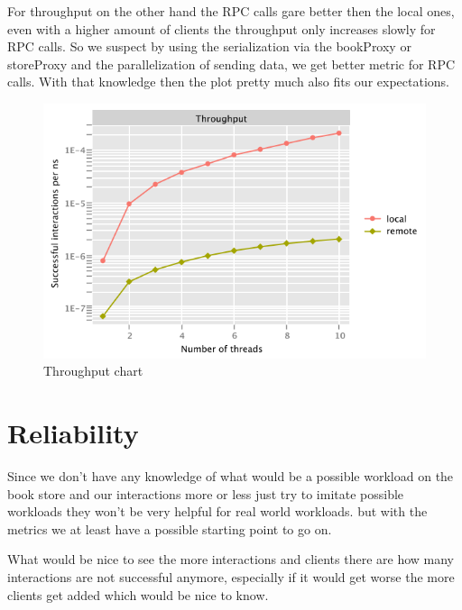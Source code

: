 \documentclass[12pt,a4paper]{article}
\begin{document}
For throughput on the other hand the RPC calls gare better then the local ones, even with a higher amount of clients the throughput only increases slowly for RPC calls.
So we suspect by using the serialization via the bookProxy or storeProxy and the parallelization of sending data, we get better metric for RPC calls.
With that knowledge then the plot pretty much also fits our expectations.

\begin{figure}[htb!]
	\includegraphics[width=\textwidth]{throughput_chart}
	\caption{Throughput chart}
\end{figure}
\newpage
\section{Reliability}
Since we don't have any knowledge of what would be a possible workload on the book store and our interactions more or less just try to imitate possible workloads they won't be very helpful for real world workloads.
but with the metrics we at least have a possible starting point to go on.

What would be nice to see the more interactions and clients there are how many interactions are not successful anymore, especially if it would get worse the more clients get added which would be nice to know.
\end{document}
